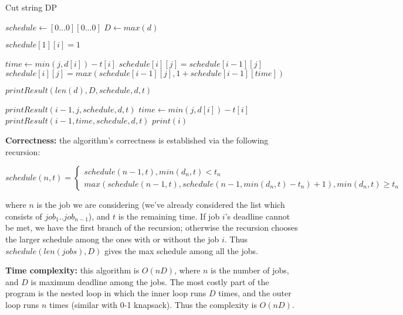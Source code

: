 \documentclass{article}
\begin{document}
\begin{description}
  \begin{algorithm}[H]
  \caption{Cut string DP}
  \label{alg:job-scheduling-dp}
    \begin{algorithmic}[1]

      \State $schedule \gets [0...0][0...0]$
      \State $D \gets max(d)$

        \State $schedule[1][i] = 1$
      \EndFor

          \State $time \gets min(j, d[i]) - t[i]$
            \State $schedule[i][j] = schedule[i-1][j]$
          \Else
            \State $schedule[i][j] = max(schedule[i-1][j], 1 + schedule[i-1][time])$
          \EndIf
        \EndFor
      \EndFor

      \State $printResult(len(d), D, schedule, d, t)$
      \State {}
    \EndFunction

        \State \Return {}
      \EndIf

        \State $printResult(i-1, j, schedule, d, t)$
      \Else
        \State $time \gets min(j, d[i]) - t[i]$
        \State $printResult(i-1, time, schedule, d, t)$
        \State $print(i)$
      \EndIf
    \EndFunction

    \end{algorithmic}
  \end{algorithm}

  \textbf{Correctness:} the algorithm's correctness is established via the following recursion:

\[
  schedule(n,t) = \begin{cases}
                    schedule(n-1, t), min(d_n, t) < t_n \\
                    max(schedule(n-1, t), schedule(n-1, min(d_n, t) - t_n) + 1), min(d_n, t) \geq t_n
                  \end{cases}
\]

  where $n$ is the job we are considering (we've already considered the list which consists of $job_1..job_{n-1}$), and $t$ is the remaining time. If job $i$'s deadline cannot be met, we have the first branch of the recursion; otherwise the recursion chooses the larger schedule among the ones with or without the job $i$. Thus $schedule(len(jobs), D)$ gives the max schedule among all the jobs.
  
  \textbf{Time complexity:} this algorithm is $O(nD)$, where $n$ is the number of jobs, and $D$ is maximum deadline among the jobs. The most costly part of the program is the nested loop in which the inner loop runs $D$ times, and the outer loop runs $n$ times (similar with 0-1 knapsack). Thus the complexity is $O(nD)$.

\end{description}
\end{document}
